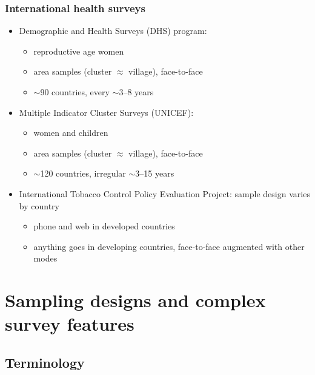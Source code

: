 \documentclass[handout]{beamer}
\begin{document}
\begin{frame}\frametitle{International health surveys}

\begin{itemize}
    \item Demographic and Health Surveys (DHS) program:
    \begin{itemize}
        \item reproductive age women
        \item area samples (cluster $\approx$ village), face-to-face
        \item $\sim$90 countries, every $\sim$3--8 years
    \end{itemize}
    \item Multiple Indicator Cluster Surveys (UNICEF):
    \begin{itemize}
        \item women and children
        \item area samples (cluster $\approx$ village), face-to-face
        \item $\sim$120 countries, irregular $\sim$3--15 years
    \end{itemize}
    \item International Tobacco Control Policy Evaluation Project: sample design varies by country
    \begin{itemize}
        \item phone and web in developed countries
        \item anything goes in developing countries, face-to-face augmented with other modes
    \end{itemize}
\end{itemize}

\end{frame}

\section{Sampling designs and complex survey features}

\subsection{Terminology}
\end{document}
